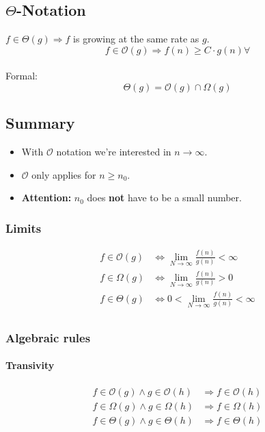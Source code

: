 \documentclass[12pt, a4paper]{scrartcl}
\newcommand{\bigO}{\mathcal{O}}
\begin{document}
\subsection{$\Theta$-Notation}
\label{sec:Theta-notation}
$f\in\Theta(g)\Rightarrow f$ is growing at the same rate as $g$.
\[f\in\mathcal{O}(g)\Rightarrow f(n)\ge C\cdot g(n)\forall\]\\
Formal:
\[\Theta(g)=\mathcal{O}(g)\cap\Omega(g)
\]

\subsection{Summary}
\begin{itemize}
\item With $\bigO$ notation we're interested in $n\rightarrow\infty$. 
\item $\bigO$ only applies for $n\ge n_0$.
\item \textbf{Attention:} $n_0$ does \textbf{not} have to be a small number.
\end{itemize}


\subsubsection{Limits}
\begin{align}
  f\in\mathcal{O}(g)&\Leftrightarrow\lim_{N\rightarrow\infty}\frac{f(n)}{g(n)}<\infty\\
  f\in\Omega(g)&\Leftrightarrow\lim_{N\rightarrow\infty}\frac{f(n)}{g(n)}>0\\
  f\in\Theta(g)&\Leftrightarrow0<\lim_{N\rightarrow\infty}\frac{f(n)}{g(n)}<\infty\\
\end{align}

\subsubsection{Algebraic rules}
\paragraph{Transivity}
\begin{align}
  f\in\mathcal{O}(g)\land g\in\mathcal{O}(h)&\Rightarrow f \in \mathcal{O}(h)\\
  f\in\Omega(g)\land g\in\Omega(h)&\Rightarrow f \in \Omega(h)\\
  f\in\Theta(g)\land g\in\Theta(h)&\Rightarrow f \in \Theta(h)\\
\end{align}
\end{document}

